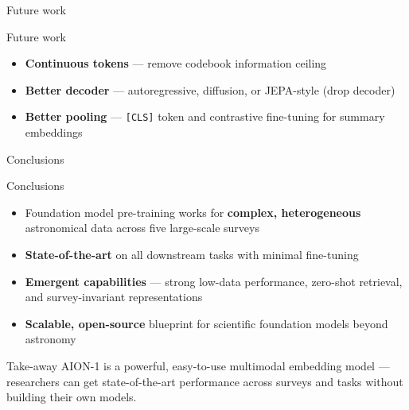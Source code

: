 \documentclass[10pt]{beamer}
\begin{document}
\begin{frame}[standout]
  Future work
\end{frame}

\begin{frame}{Future work}
  \begin{itemize}
    \item \textbf{Continuous tokens} — remove codebook information ceiling
    \item \textbf{Better decoder} — autoregressive, diffusion, or JEPA-style (drop decoder)
    \item \textbf{Better pooling} — \texttt{[CLS]} token and contrastive fine-tuning for summary embeddings
  \end{itemize}
\end{frame}

\begin{frame}[standout]
  Conclusions
\end{frame}

\begin{frame}{Conclusions}
  \begin{itemize}\small
    \item Foundation model pre-training works for \textbf{complex,
          heterogeneous} astronomical data across five large-scale surveys
    \item \textbf{State-of-the-art} on all downstream tasks with minimal
          fine-tuning
    \item \textbf{Emergent capabilities} — strong low-data performance,
          zero-shot retrieval, and survey-invariant representations
    \item \textbf{Scalable, open-source} blueprint for scientific foundation
          models beyond astronomy
  \end{itemize}
  \begin{alertblock}{Take-away}
    AION-1 is a powerful, easy-to-use multimodal embedding model —
    researchers can get state-of-the-art performance across surveys and
    tasks without building their own models.
  \end{alertblock}
\end{frame}

\appendix
\end{document}
